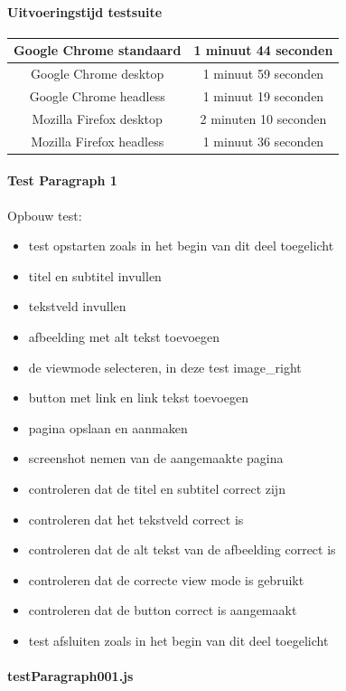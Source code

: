 \paragraph{Uitvoeringstijd testsuite}
\begin{tabular}{ |c| c| }
\hline
	Google Chrome standaard & 1 minuut 44 seconden \\
\hline
	Google Chrome desktop & 1 minuut 59 seconden \\
\hline
 	Google Chrome headless & 1 minuut 19 seconden \\
\hline
 	Mozilla Firefox desktop & 2 minuten 10 seconden \\
\hline
 	Mozilla Firefox headless & 1 minuut 36 seconden \\
\hline
\end{tabular}


\clearpage
\paragraph{Test Paragraph 1}
\label{test1}
Opbouw test: 
\begin{itemize}
\item test opstarten zoals in het begin van dit deel toegelicht
\item titel en subtitel invullen
\item tekstveld invullen
\item afbeelding met alt tekst toevoegen
\item de viewmode selecteren, in deze test image\_right
\item button met link en link tekst toevoegen
\item pagina opslaan en aanmaken
\item screenshot nemen van de aangemaakte pagina
\item controleren dat de titel en subtitel correct zijn
\item controleren dat het tekstveld correct is
\item controleren dat de alt tekst van de afbeelding correct is
\item controleren dat de correcte view mode is gebruikt
\item controleren dat de button correct is aangemaakt
\item test afsluiten zoals in het begin van dit deel toegelicht
\end{itemize}
\clearpage
\paragraph{testParagraph001.js}


